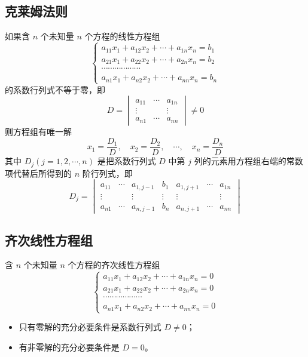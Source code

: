 \documentclass[UTF8]{ctexart}
\theoremstyle{mydef}
\begin{document}
\subsection{克莱姆法则}
如果含 $n$ 个未知量 $n$ 个方程的线性方程组
$$
\begin{cases}
a_{11}x_1 + a_{12}x_2 + \cdots + a_{1n}x_n = b_1 \\
a_{21}x_1 + a_{22}x_2 + \cdots + a_{2n}x_n = b_2 \\
\cdots \cdots \cdots \cdots \cdots \cdots \\
a_{n1}x_1 + a_{n2}x_2 + \cdots + a_{nn}x_n = b_n
\end{cases}
$$
的系数行列式不等于零，即
$$
D = \begin{vmatrix}
a_{11} & \cdots & a_{1n} \\
\vdots & & \vdots \\
a_{n1} & \cdots & a_{nn}
\end{vmatrix} \neq 0
$$
则方程组有唯一解
$$
x_1 = \frac{D_1}{D}, \quad x_2 = \frac{D_2}{D}, \quad \cdots, \quad x_n = \frac{D_n}{D}
$$
其中 $D_j (j=1, 2, \cdots, n)$ 是把系数行列式 $D$ 中第 $j$ 列的元素用方程组右端的常数项代替后所得到的 $n$ 阶行列式，即
$$
D_j = \begin{vmatrix}
a_{11} & \cdots & a_{1, j-1} & b_1 & a_{1, j+1} & \cdots & a_{1n} \\
\vdots & & \vdots & \vdots & \vdots & & \vdots \\
a_{n1} & \cdots & a_{n, j-1} & b_n & a_{n, j+1} & \cdots & a_{nn}
\end{vmatrix}
$$

\subsection{齐次线性方程组}
含 $n$ 个未知量 $n$ 个方程的齐次线性方程组
$$
\begin{cases}
a_{11}x_1 + a_{12}x_2 + \cdots + a_{1n}x_n = 0 \\
a_{21}x_1 + a_{22}x_2 + \cdots + a_{2n}x_n = 0 \\
\cdots \cdots \cdots \cdots \cdots \cdots \\
a_{n1}x_1 + a_{n2}x_2 + \cdots + a_{nn}x_n = 0
\end{cases}
$$
\begin{itemize}
    \item 只有零解的充分必要条件是系数行列式 $D \neq 0$；
    \item 有非零解的充分必要条件是 $D = 0$。
\end{itemize}
\end{document}
